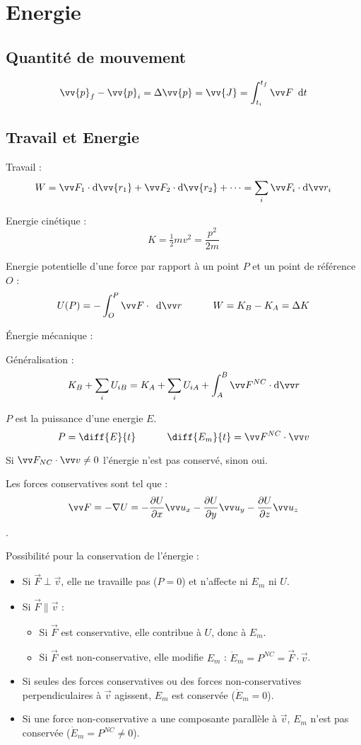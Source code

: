 \documentclass[../main.tex]{subfiles}
\begin{document}
\section{Energie}
\subsection{Quantité de mouvement}
\[
  \vv{p}_f - \vv{p}_i = \Delta\vv{p} = \vv{J} = \int_{t_i}^{t_f}\F\dee{t}
\]

\subsection{Travail et Energie}

Travail : 
\[
  W= \F_1\cdot\mathrm{d}\vv{r_1} + \F_2\cdot\mathrm{d}\vv{r_2} + \dots =\sum_i \F_i\cdot\mathrm{d}\pos_i
\]

Energie cinétique :
\[
  K = \tfrac{1}{2}mv^2 = \frac{p^2}{2m}
\]

Energie potentielle d'une force \F{} par rapport à un point \(P\) et un point de référence \(O\) : 
\[
  U(P)=-\int_O^P\F\cdot\dee{\pos}\phantom{texttex} W = K_B - K_A = \Delta K
\]

Énergie mécanique :

Généralisation : 
\[
  K_B + \sum_i U_{iB} = K_A + \sum_i U_{iA} + \int_A^B \F^{NC}\cdot\mathrm{d}\pos
\]

\(P\) est la puissance d'une energie \(E\). 
\[
  P = \diff{E}{t} \phantom{textext} \diff{E_m}{t} = \F^{NC}\cdot\vi
\]

Si \(\F_{NC}\cdot\vi \neq 0 \) l'énergie n'est pas conservé, sinon oui. 

Les forces conservatives sont tel que :
\[
  \F=-\nabla U=-\frac{\partial U}{\partial x}\ux-\frac{\partial U}{\partial y}\uy-\frac{\partial U}{\partial z}\uz
\].

Possibilité pour la conservation de l'énergie : 
\begin{itemize}
  \item Si \(\vec{F} \perp \vec{v}\), elle ne travaille pas (\(P = 0\)) et n'affecte ni \(E_m\) ni \(U\).
  \item Si \(\vec{F} \parallel \vec{v}\) :
    \begin{itemize}
      \item Si \(\vec{F}\) est conservative, elle contribue à \(U\), donc à \(E_m\).
      \item Si \(\vec{F}\) est non-conservative, elle modifie \(E_m\) : \(\dot{E}_m = P^{NC} = \vec{F} \cdot \vec{v}\).
    \end{itemize}
  \item Si seules des forces conservatives ou des forces non-conservatives perpendiculaires à \(\vec{v}\) agissent, \(E_m\) est conservée (\(\dot{E}_m = 0\)).
  \item Si une force non-conservative a une composante parallèle à \(\vec{v}\), \(E_m\) n'est pas conservée (\(\dot{E}_m = P^{NC} \neq 0\)).
\end{itemize}
\end{document}

